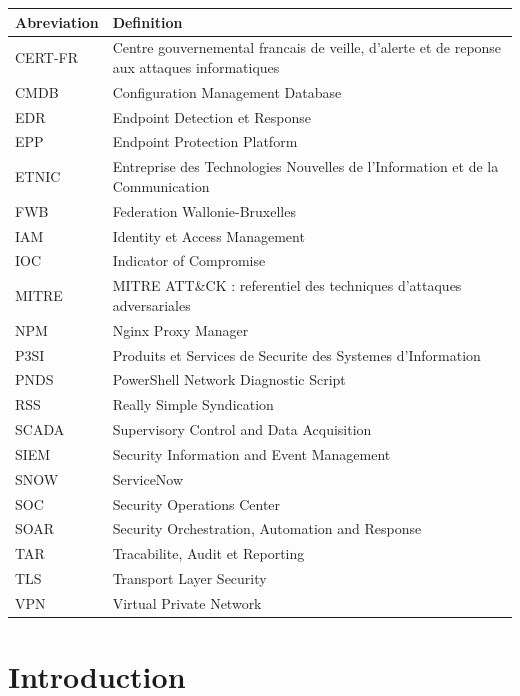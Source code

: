 \documentclass{rapport}
\begin{document}
\begin{tabularx}{\linewidth}{lX}
\toprule
\textbf{Abreviation} & \textbf{Definition} \\
\midrule
CERT-FR  & Centre gouvernemental francais de veille, d'alerte et de reponse aux attaques informatiques \\
CMDB     & Configuration Management Database \\
EDR      & Endpoint Detection et Response \\
EPP      & Endpoint Protection Platform \\
ETNIC    & Entreprise des Technologies Nouvelles de l'Information et de la Communication \\
FWB      & Federation Wallonie-Bruxelles \\
IAM      & Identity et Access Management \\
IOC      & Indicator of Compromise \\
MITRE    & MITRE ATT\&CK : referentiel des techniques d'attaques adversariales \\
NPM      & Nginx Proxy Manager \\
P3SI     & Produits et Services de Securite des Systemes d'Information \\
PNDS     & PowerShell Network Diagnostic Script \\
RSS      & Really Simple Syndication \\
SCADA    & Supervisory Control and Data Acquisition \\
SIEM     & Security Information and Event Management \\
SNOW     & ServiceNow \\
SOC      & Security Operations Center \\
SOAR     & Security Orchestration, Automation and Response \\
TAR      & Tracabilite, Audit et Reporting \\
TLS      & Transport Layer Security \\
VPN      & Virtual Private Network \\
\bottomrule
\end{tabularx}

\newpage
\section{Introduction}
\end{document}
